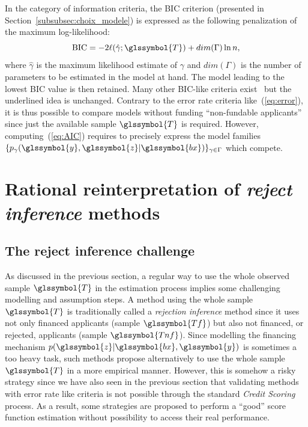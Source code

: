 In the category of information criteria, the BIC criterion (presented in Section~\ref{subsubsec:choix_modele}) is expressed as the following penalization of the maximum log-likelihood:
\begin{equation}\label{eq:AIC}
\mbox{BIC} = - 2 \ell(\hat\gamma;\glssymbol{T}) + dim(\Gamma) \ln n,
\end{equation}
where $\hat\gamma$ is the maximum likelihood estimate of $\gamma$ and $dim(\Gamma)$ is the number of parameters to be estimated in the model at hand. The model leading to the lowest BIC value is then retained. Many other BIC-like criteria exist~\cite{vandewalle:tel-00447141} but the underlined idea is unchanged. Contrary to the error rate criteria like~(\ref{eq:error}), it is thus possible to compare models without funding ``non-fundable applicants'' since just the available sample $\glssymbol{T}$ is required. However, computing~(\ref{eq:AIC}) requires to precisely express the model families $\{p_{\gamma}(\glssymbol{y},\glssymbol{z}|\glssymbol{bx})\}_{\gamma \in \Gamma}$ which compete.

\section{Rational reinterpretation of \textit{reject inference} methods} \label{sec:methods_reject}

\subsection{The reject inference challenge} \label{subsec:challenge}

As discussed in the previous section, a regular way to use the whole observed sample $\glssymbol{T}$ in the estimation process implies some challenging modelling and assumption steps. A method using the whole sample $\glssymbol{T}$ is traditionally called a {\it rejection inference} method since it uses not only financed applicants (sample $\glssymbol{Tf}$) but also not financed, or rejected, applicants (sample $\glssymbol{Tnf}$).
Since modelling the financing mechanism $p(\glssymbol{z} | \glssymbol{bx}, \glssymbol{y})$ is sometimes a too heavy task, such methods propose alternatively to use the whole sample $\glssymbol{T}$ in a more empirical manner. However, this is somehow a risky strategy since we have also seen in the previous section that validating methods with error rate like criteria is not possible through the standard \textit{Credit Scoring} process. As a result, some strategies are proposed to perform a ``good'' \gls{score} function estimation without possibility to access their real performance.

